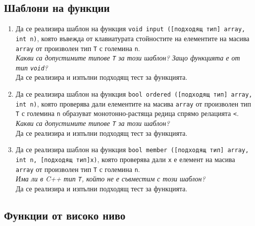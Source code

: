 {\subsection{Шаблони на функции}

\begin{enumerate}

	\item Да се реализира шаблон на функция \texttt{void input ([подходящ тип] array, int n)}, която въвежда от клавиатурата стойностите на елементите на масива \texttt{array} от произволен тип \texttt{T} с големина \texttt{n}. \\

	\textit{Какви са допустимите типове \texttt{T} за този шаблон? Защо функцията е от тип \texttt{void}?}\\

	Да се реализира и изпълни подходящ тест за функцията.

	\item Да се реализира шаблон на функция \texttt{bool ordered ([подходящ тип] array, int n)}, която проверява дали елементите на масива \texttt{array} от произволен тип \texttt{T} с големина \texttt{n} образуват монотонно-растяща редица спрямо релацията \texttt{<}.\\

	\textit{Какви са допустимите типове \texttt{T} за този шаблон?}\\

	Да се реализира и изпълни подходящ тест за функцията.

	\item Да се реализира шаблон на функция \texttt{bool member ([подходящ тип] array, int n, [подходящ тип]x)}, която проверява дали \texttt{x} е елемент на масива \texttt{array} от произволен тип \texttt{T} с големина \texttt{n}.\\

	\textit{Има ли в C++ тип \texttt{T}, който не е съвместим с този шаблон?}\\

	Да се реализира и изпълни подходящ тест за функцията.

\end{enumerate}

\pagebreak
\subsection {Функции от високо ниво}

\begin{enumerate}[resume]  



\end{enumerate}}
